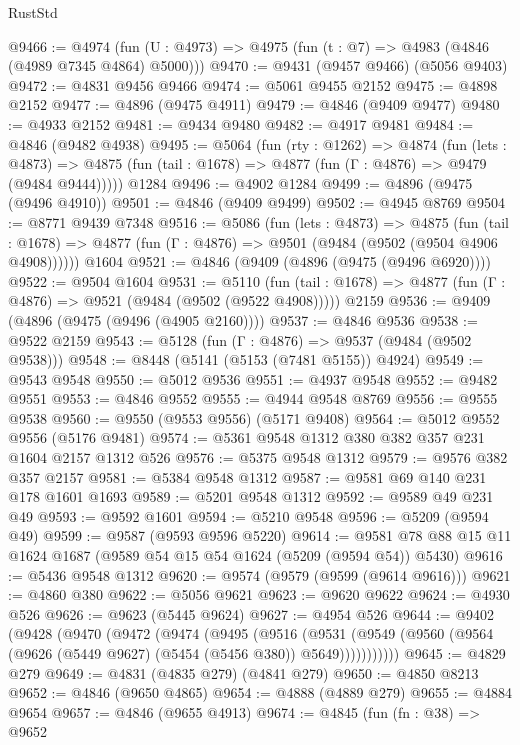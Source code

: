 \begin{lexlean}{RustStd}
\begin{coremodule}
@9466 := @4974 (fun (U : @4973) => @4975 (fun (t : @7) => @4983 (@4846 (@4989 @7345 @4864) @5000)))
@9470 := @9431 (@9457 @9466) (@5056 @9403)
@9472 := @4831 @9456 @9466
@9474 := @5061 @9455 @2152
@9475 := @4898 @2152
@9477 := @4896 (@9475 @4911)
@9479 := @4846 (@9409 @9477)
@9480 := @4933 @2152
@9481 := @9434 @9480
@9482 := @4917 @9481
@9484 := @4846 (@9482 @4938)
@9495 := @5064
    (fun (rty : @1262) =>
    @4874
      (fun (lets : @4873) =>
      @4875 (fun (tail : @1678) => @4877 (fun (Γ : @4876) => @9479 (@9484 @9444)))))
    @1284
@9496 := @4902 @1284
@9499 := @4896 (@9475 (@9496 @4910))
@9501 := @4846 (@9409 @9499)
@9502 := @4945 @8769
@9504 := @8771 @9439 @7348
@9516 := @5086
    (fun (lets : @4873) =>
    @4875
      (fun (tail : @1678) => @4877 (fun (Γ : @4876) => @9501 (@9484 (@9502 (@9504 @4906 @4908))))))
    @1604
@9521 := @4846 (@9409 (@4896 (@9475 (@9496 @6920))))
@9522 := @9504 @1604
@9531 := @5110
    (fun (tail : @1678) => @4877 (fun (Γ : @4876) => @9521 (@9484 (@9502 (@9522 @4908)))))
    @2159
@9536 := @9409 (@4896 (@9475 (@9496 (@4905 @2160))))
@9537 := @4846 @9536
@9538 := @9522 @2159
@9543 := @5128 (fun (Γ : @4876) => @9537 (@9484 (@9502 @9538)))
@9548 := @8448 (@5141 (@5153 (@7481 @5155)) @4924)
@9549 := @9543 @9548
@9550 := @5012 @9536
@9551 := @4937 @9548
@9552 := @9482 @9551
@9553 := @4846 @9552
@9555 := @4944 @9548 @8769
@9556 := @9555 @9538
@9560 := @9550 (@9553 @9556) (@5171 @9408)
@9564 := @5012 @9552 @9556 (@5176 @9481)
@9574 := @5361 @9548 @1312 @380 @382 @357 @231 @1604 @2157 @1312 @526
@9576 := @5375 @9548 @1312
@9579 := @9576 @382 @357 @2157
@9581 := @5384 @9548 @1312
@9587 := @9581 @69 @140 @231 @178 @1601 @1693
@9589 := @5201 @9548 @1312
@9592 := @9589 @49 @231 @49
@9593 := @9592 @1601
@9594 := @5210 @9548
@9596 := @5209 (@9594 @49)
@9599 := @9587 (@9593 @9596 @5220)
@9614 := @9581 @78 @88 @15 @11 @1624 @1687 (@9589 @54 @15 @54 @1624 (@5209 (@9594 @54)) @5430)
@9616 := @5436 @9548 @1312
@9620 := @9574 (@9579 (@9599 (@9614 @9616)))
@9621 := @4860 @380
@9622 := @5056 @9621
@9623 := @9620 @9622
@9624 := @4930 @526
@9626 := @9623 (@5445 @9624)
@9627 := @4954 @526
@9644 := @9402
    (@9428
      (@9470
        (@9472
          (@9474
            (@9495
              (@9516
                (@9531
                  (@9549 (@9560 (@9564 (@9626 (@5449 @9627) (@5454 (@5456 @380)) @5649)))))))))))
@9645 := @4829 @279
@9649 := @4831 (@4835 @279) (@4841 @279)
@9650 := @4850 @8213
@9652 := @4846 (@9650 @4865)
@9654 := @4888 (@4889 @279)
@9655 := @4884 @9654
@9657 := @4846 (@9655 @4913)
@9674 := @4845
    (fun (fn : @38) =>
    @9652

\end{coremodule}
\end{lexlean}
